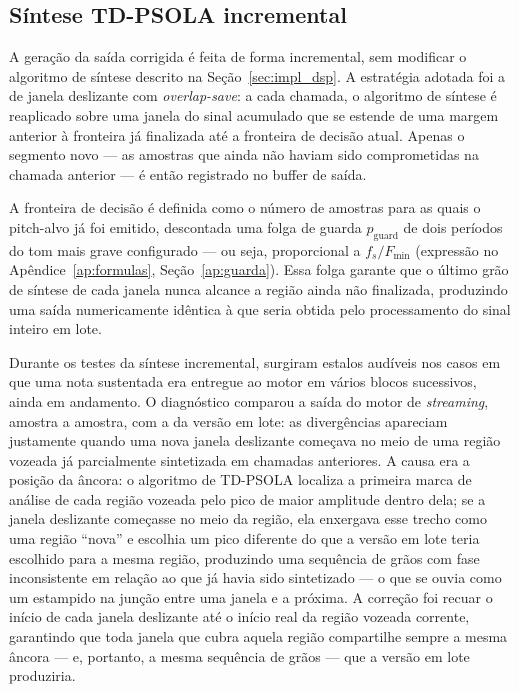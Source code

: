 \subsection{Síntese TD-PSOLA incremental}

A geração da saída corrigida é feita de forma incremental, sem modificar o algoritmo de síntese descrito na Seção~\ref{sec:impl_dsp}. A estratégia adotada foi a de janela deslizante com \textit{overlap-save}: a cada chamada, o algoritmo de síntese é reaplicado sobre uma janela do sinal acumulado que se estende de uma margem anterior à fronteira já finalizada até a fronteira de decisão atual. Apenas o segmento novo --- as amostras que ainda não haviam sido comprometidas na chamada anterior --- é então registrado no buffer de saída.

A fronteira de decisão é definida como o número de amostras para as quais o pitch-alvo já foi emitido, descontada uma folga de guarda $p_{\text{guard}}$ de dois períodos do tom mais grave configurado --- ou seja, proporcional a $f_s / F_{\min}$ (expressão no Apêndice~\ref{ap:formulas}, Seção~\ref{ap:guarda}). Essa folga garante que o último grão de síntese de cada janela nunca alcance a região ainda não finalizada, produzindo uma saída numericamente idêntica à que seria obtida pelo processamento do sinal inteiro em lote.

Durante os testes da síntese incremental, surgiram estalos audíveis nos casos em que uma nota sustentada era entregue ao motor em vários blocos sucessivos, ainda em andamento. O diagnóstico comparou a saída do motor de \textit{streaming}, amostra a amostra, com a da versão em lote: as divergências apareciam justamente quando uma nova janela deslizante começava no meio de uma região vozeada já parcialmente sintetizada em chamadas anteriores. A causa era a posição da âncora: o algoritmo de TD-PSOLA localiza a primeira marca de análise de cada região vozeada pelo pico de maior amplitude dentro dela; se a janela deslizante começasse no meio da região, ela enxergava esse trecho como uma região ``nova'' e escolhia um pico diferente do que a versão em lote teria escolhido para a mesma região, produzindo uma sequência de grãos com fase inconsistente em relação ao que já havia sido sintetizado --- o que se ouvia como um estampido na junção entre uma janela e a próxima. A correção foi recuar o início de cada janela deslizante até o início real da região vozeada corrente, garantindo que toda janela que cubra aquela região compartilhe sempre a mesma âncora --- e, portanto, a mesma sequência de grãos --- que a versão em lote produziria.

